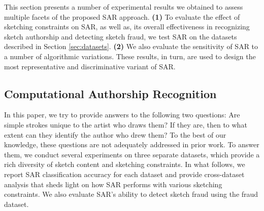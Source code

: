 This section presents a number of experimental results we obtained to assess multiple facets of the proposed SAR approach. \textbf{(1)} To evaluate the effect of sketching constraints on SAR, as well as, its overall effectiveness in recognizing sketch authorship and detecting sketch fraud, we test SAR on the datasets described in Section \ref{sec:datasets}. \textbf{(2)} We also evaluate the sensitivity of SAR to a number of algorithmic variations. These results, in turn, are used to design the most representative and discriminative variant of SAR. %

\vspace{-2mm}
\subsection{Computational Authorship Recognition}\label{subsec:recognition}
\vspace{-3mm}
In this paper, we try to provide answers to the following two questions: Are simple strokes unique to the artist who draws them?  If they are, then to what extent can they identify the author who drew them? To the best of our knowledge, these questions are not adequately addressed in prior work. To answer them, we conduct several experiments on three separate datasets, which provide a rich diversity of sketch content and sketching constraints. In what follows, we report SAR classification accuracy for each dataset and provide cross-dataset analysis that sheds light on how SAR performs with various sketching constraints. We also evaluate SAR's ability to detect sketch fraud using the fraud dataset.


